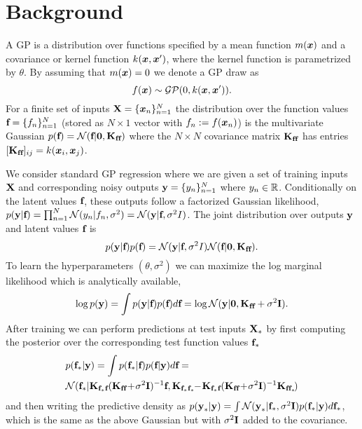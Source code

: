 \section{Background
\label{sec:background}
}

A GP is a distribution over functions specified by a mean function $m(\boldsymbol{x})$ and a covariance or kernel function $k(\boldsymbol{x}, \boldsymbol{x}')$, where the kernel function is parametrized by $\theta$. 
By assuming that $m(\boldsymbol{x}) = 0$ we denote a GP draw as 
$$
f(\boldsymbol{x}) \sim \mathcal{GP}(0, k(\boldsymbol{x}, \boldsymbol{x}')). 
$$
For a finite set of inputs 
$\textbf{X} = \{\boldsymbol{x}_n\}_{n=1}^N$ the 
distribution over the function values $\textbf{f}
= \{f_n \}_{n=1}^N$ (stored as $N \times 1$ vector with $f_n := f(\boldsymbol{x}_n)$) is 
the multivariate Gaussian $p(\textbf{f}) = \mathcal{N}(\textbf{f} | {\bf 0}, \textbf{K}_{\textbf{f} \textbf{f}} )$ where the $N \times N$ covariance 
matrix $\textbf{K}_{\textbf{f} \textbf{f}}$ has entries $[\textbf{K}_{\textbf{f} \textbf{f}}]_{i j} = k(\boldsymbol{x}_i, \boldsymbol{x}_j)$. 

We consider standard GP regression
where we are given a set of training inputs
$\textbf{X}$ and corresponding noisy outputs 
$\textbf{y} = \{y_n\}_{n=1}^N$ where 
$y_n \in \mathbb{R}$. Conditionally on the latent values $\textbf{f}$, these outputs follow a factorized
Gaussian likelihood, $p(\textbf{y} | \textbf{f}) = \prod_{n=1}^N \mathcal{N}(y_n | f_n, \sigma^2) = \mathcal{N}(\textbf{y} | \textbf{f}, \sigma^2 I)$. The joint distribution over outputs $\textbf{y}$ 
and latent values $\textbf{f}$ is
\begin{equation}
p(\textbf{y} | \textbf{f}) p(\textbf{f}) = \mathcal{N}(\textbf{y} | \textbf{f}, \sigma^2 I) \mathcal{N}(\textbf{f} | {\bf 0}, \textbf{K}_{\textbf{f} \textbf{f}} ).
\end{equation}
To learn the hyperparameters 
$(\theta, \sigma^2)$ we can maximize the
log marginal likelihood which is analytically available,
\begin{equation}
\log p(\textbf{y}) = \int p(\textbf{y} | \textbf{f}) p(\textbf{f}) d \textbf{f} = \log \mathcal{N}(\textbf{y} | {\bf 0 }, \textbf{K}_{\textbf{f} \textbf{f}}  + \sigma^2 \textbf{I}). 
\label{eq:exact_marg_likel}
\end{equation}
After training we can perform predictions at test inputs $\textbf{X}_*$
by first computing the posterior 
over the corresponding test function values $\textbf{f}_*$
\begin{align}
& p(\f_* | \y) = \int p(\f_* | \f) p(\f | \y) d \f = \\
 & \mathcal{N}(\f_* | \bK_{\f_* \f} (\bK_{\f \f} \! + \! \sigma^2 \bI)^{-1} \f,  \bK_{\f_* \f_*} \! \! - \! \bK_{\f_* \f} (\bK_{\f \f} \! + \! \sigma^2 \bI)^{-1} \bK_{\f \f_*} \! ) \nonumber 
\end{align} 
and then writing the predictive density as $p(\textbf{y}_* | \textbf{y}) = \int \mathcal{N}(\textbf{y}_* | \textbf{f}_*, \sigma^2 \textbf{I}) p(\textbf{f}_* | \textbf{y}) d \textbf{f}_*$, which is the same as the above Gaussian but with  $\sigma^2 \textbf{I}$ added to the covariance. 
 
